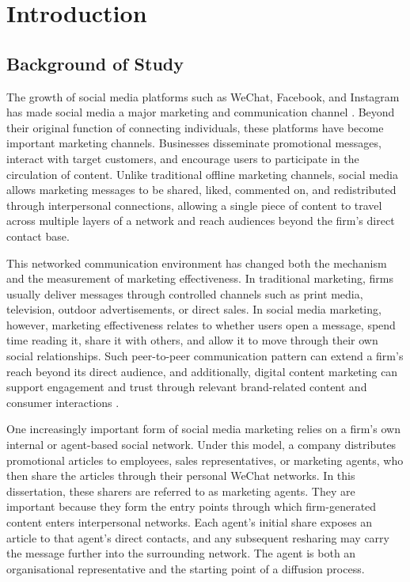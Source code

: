 ﻿\chapter{Introduction}
\label{chap:introduction}

\section{Background of Study}
\label{sec:1-1-background-of-study}

The growth of social media platforms such as WeChat, Facebook, and Instagram has made social media a major marketing and communication channel \parencite{appel2020,mangold2009}. Beyond their original function of connecting individuals, these platforms have become important marketing channels. Businesses disseminate promotional messages, interact with target customers, and encourage users to participate in the circulation of content. Unlike traditional offline marketing channels, social media allows marketing messages to be shared, liked, commented on, and redistributed through interpersonal connections, allowing a single piece of content to travel across multiple layers of a network and reach audiences beyond the firm's direct contact base.

This networked communication environment has changed both the mechanism and the measurement of marketing effectiveness. In traditional marketing, firms usually deliver messages through controlled channels such as print media, television, outdoor advertisements, or direct sales. In social media marketing, however, marketing effectiveness relates to whether users open a message, spend time reading it, share it with others, and allow it to move through their own social relationships. Such peer-to-peer communication pattern can extend a firm's reach beyond its direct audience, and additionally, digital content marketing can support engagement and trust through relevant brand-related content and consumer interactions \parencite{hollebeek2019,mangold2009}.

One increasingly important form of social media marketing relies on a firm's own internal or agent-based social network. Under this model, a company distributes promotional articles to employees, sales representatives, or marketing agents, who then share the articles through their personal WeChat networks. In this dissertation, these sharers are referred to as marketing agents. They are important because they form the entry points through which firm-generated content enters interpersonal networks. Each agent's initial share exposes an article to that agent's direct contacts, and any subsequent resharing may carry the message further into the surrounding network. The agent is both an organisational representative and the starting point of a diffusion process.

